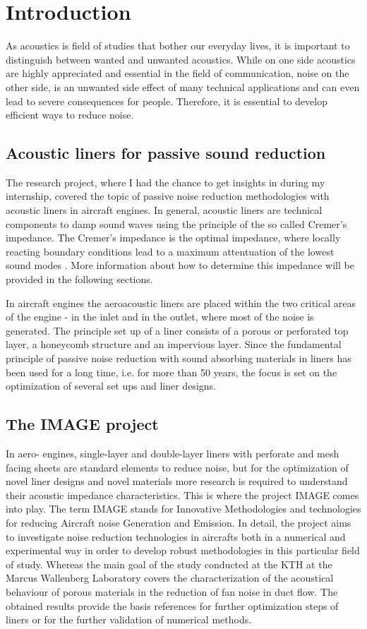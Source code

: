\documentclass[11pt]{report} %
\begin{document}
\chapter{Introduction} 
\label{chap:Introduction}
As acoustics is field of studies that bother our everyday lives, it is important to distinguish between wanted and unwanted acoustics.
While on one side acoustics are highly appreciated and essential in the field of communication, noise on the other side, is an unwanted side effect of many technical applications and can even lead to severe consequences for people.
Therefore, it is essential to develop efficient ways to reduce noise.

\section{Acoustic liners for passive sound reduction}
The research project, where I had the chance to get insights in during my internship, covered the topic of passive noise reduction methodologies with acoustic liners in aircraft engines.
In general, acoustic liners are technical components to damp sound waves using the principle of the so called Cremer's impedance. 
The Cremer's impedance is the optimal impedance, where locally reacting boundary conditions lead to a maximum attentuation of the lowest sound modes \cite{Kabral2017}.
More information about how to determine this impedance will be provided in the following sections.

In aircraft engines the aeroacoustic liners are placed within the two critical areas of the engine - in the inlet and in the outlet, where most of the noise is generated. 	 
The principle set up of a liner consists of a porous or perforated top layer, a honeycomb structure and an impervious layer. 
Since the fundamental principle of passive noise reduction with sound absorbing materials in liners has been used for a long time, i.e. for more than 50 years, the focus is set on the optimization of several set ups and liner designs.

\section{The IMAGE project} 
In aero- engines, single-layer and double-layer liners with perforate and mesh facing sheets are standard elements to reduce noise, but for the optimization of novel liner designs and novel materials more research is required to understand their acoustic impedance characteristics.
This is where the project IMAGE comes into play.
The term IMAGE stands for Innovative Methodologies and technologies for reducing Aircraft noise Generation and Emission.
In detail, the project aims to investigate noise reduction technologies in aircrafts both in a numerical and experimental way in order to develop robust methodologies in this particular field of study.  
Whereas the main goal of the study conducted at the KTH at the Marcus Wallenberg Laboratory covers the characterization of the acoustical behaviour of porous materials in the reduction of fan noise in duct flow. 
The obtained results provide the basis references for further optimization steps of liners or for the further validation of numerical methods. 
\end{document}
